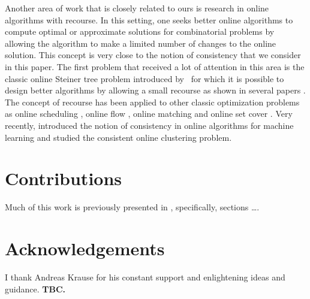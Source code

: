 Another area of work that is closely related to ours is research in online algorithms with recourse. In this setting, one seeks better online algorithms to compute optimal or approximate solutions for combinatorial problems by allowing the algorithm to make a limited number of changes to the online solution. 
This concept is very close to the notion of consistency that we consider in this paper. The first problem that received a lot of attention in this area is the classic online Steiner tree problem introduced by~\cite{DBLP:journals/siamdm/ImaseW91} for which it is possible to design better algorithms by allowing a small recourse as shown in several papers \citep{DBLP:journals/siamcomp/GuG016, DBLP:conf/soda/GuptaK14, DBLP:conf/stoc/LackiOPSZ15, DBLP:journals/siamcomp/MegowSVW16}. The concept of recourse has been applied to other classic optimization problems as online scheduling \citep{DBLP:journals/algorithmica/AndrewsGZ99, DBLP:journals/algorithmica/EpsteinL14, DBLP:journals/algorithmica/PhillipsW98, DBLP:journals/mor/SandersSS09, DBLP:conf/esa/SkutellaV10}, online flow \citep{DBLP:conf/soda/GuptaKS14, DBLP:journals/jal/Westbrook00}, online matching \cite{DBLP:conf/soda/BernsteinHR18} and online set cover \citep{DBLP:conf/stoc/GuptaK0P17}. Very recently, \cite{DBLP:conf/icml/LattanziV17} introduced the notion of consistency in online algorithms for machine learning and studied the consistent online clustering problem.

\section{Contributions}
Much of this work is previously presented in \citet{karimi2019}, specifically, sections \dots.

\section{Acknowledgements}


I thank Andreas Krause for his constant support and enlightening ideas and guidance. \textbf{TBC.}
